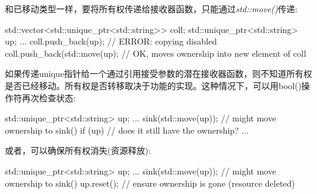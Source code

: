 和已移动类型一样，要将所有权传递给接收器函数，只能通过\textit{std::move()}传递:

\begin{cppcode}
std::vector<std::unique_ptr<std::string>> coll;
std::unique_ptr<std::string> up;
...
coll.push_back(up); // ERROR: copying disabled
coll.push_back(std::move(up); // OK, moves ownership into new element of coll
\end{cppcode}

如果传递unique指针给一个通过引用接受参数的潜在接收器函数，则不知道所有权是否已经移动。所有权是否转移取决于功能的实现。这种情况下，可以用bool()操作符再次检查状态:

\begin{cppcode}
std::unique_ptr<std::string> up;
...
sink(std::move(up)); // might move ownership to sink()
if (up) { // does it still have the ownership?
	...
}
\end{cppcode}

或者，可以确保所有权消失(资源释放):

\begin{cppcode}
std::unique_ptr<std::string> up;
...
sink(std::move(up)); // might move ownership to sink()
up.reset(); // ensure ownership is gone (resource deleted)
\end{cppcode}













